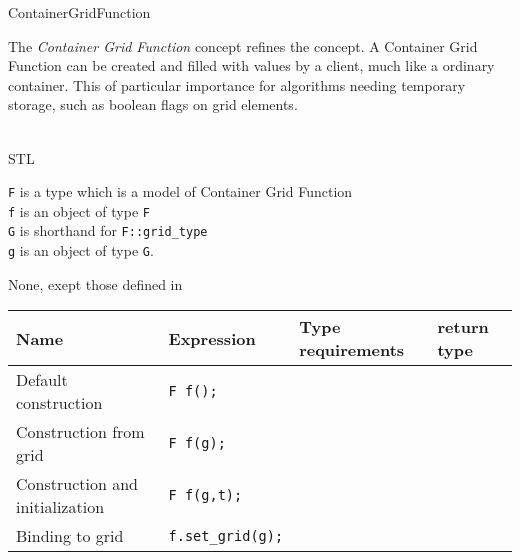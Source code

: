 \begin{Label}{ContainerGridFunction}
\end{Label}


The  {\em Container Grid Function\/} concept refines the 
 concept.
A Container Grid Function can be created and filled with values by a client,
much like a ordinary container. This of particular importance for 
algorithms needing temporary storage, such as boolean flags on grid elements.

\\
STL 

{\tt F} is a type which is a model of  Container Grid  Function 
\\
{\tt f} is an object of type  {\tt F}
\\
{\tt G} is shorthand for  {\tt F::grid\_type}
\\
{\tt g} is an object of type  {\tt G}.

None, exept those defined in

\begin{tabular}{llll} 
  \T \hline
  \bf  Name  &\bf  Expression  &\bf  Type requirements  & \bf  return type  \\ \hline
  Default construction & 
  {\tt F f();} &
  ~ &
  ~ 
  \\ 
  Construction from grid & 
  {\tt F f(g);} &
  ~ &
  ~ 
  \\ 
  Construction and initialization & 
  {\tt F f(g,t);} &
  ~ &
  ~ 
  \\ 
  Binding to grid &
  {\tt f.set\_grid(g);} &
  ~ &
  ~ 
  \T \\   \hline
\end{tabular}

